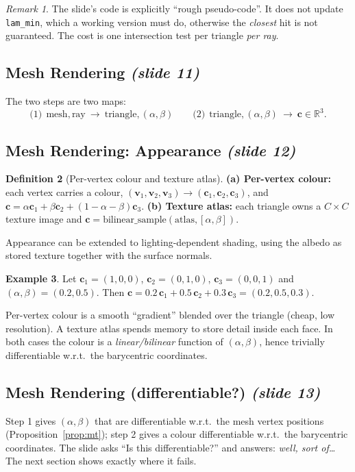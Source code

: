 \documentclass[11pt,a4paper]{article}
\newcommand{\sr}[1]{\texorpdfstring{\emph{(#1)}}{(#1)}}
\newcommand{\R}{\mathbb{R}}
\theoremstyle{definition}
\newtheorem{definition}{Definition}[section]
\newtheorem{example}[definition]{Example}
\theoremstyle{plain}
\theoremstyle{remark}
\newtheorem{remark}[definition]{Remark}
\begin{document}
\begin{remark}
The slide's code is explicitly ``rough pseudo-code''. It does not update \texttt{lam\_min}, which a working version must do, otherwise the \emph{closest} hit is not guaranteed. The cost is one intersection test per triangle \emph{per ray}.
\end{remark}

\subsection{Mesh Rendering \sr{slide 11}}
The two steps are two maps:
\[
\text{(1)}\ \ \text{mesh},\text{ray}\ \to\ \text{triangle},(\alpha,\beta)
\qquad
\text{(2)}\ \ \text{triangle},(\alpha,\beta)\ \to\ \bm c\in\R^3 .
\]

\subsection{Mesh Rendering: Appearance \sr{slide 12}}
\begin{definition}[Per-vertex colour and texture atlas]
\textbf{(a) Per-vertex colour:} each vertex carries a colour, $(\bm v_1,\bm v_2,\bm v_3)\to(\bm c_1,\bm c_2,\bm c_3)$, and
$\bm c=\alpha\bm c_1+\beta\bm c_2+(1-\alpha-\beta)\bm c_3$.
\textbf{(b) Texture atlas:} each triangle owns a $C\times C$ texture image and $\bm c=\text{bilinear\_sample}(\text{atlas},[\alpha,\beta])$.
\end{definition}
Appearance can be extended to lighting-dependent shading, using the albedo as stored texture together with the surface normals.

\begin{example}
Let $\bm c_1=(1,0,0)$, $\bm c_2=(0,1,0)$, $\bm c_3=(0,0,1)$ and $(\alpha,\beta)=(0.2,0.5)$. Then $\bm c=0.2\,\bm c_1+0.5\,\bm c_2+0.3\,\bm c_3=(0.2,0.5,0.3)$.
\end{example}

\begin{intuition}
Per-vertex colour is a smooth ``gradient'' blended over the triangle (cheap, low resolution). A texture atlas spends memory to store detail inside each face. In both cases the colour is a \emph{linear/bilinear} function of $(\alpha,\beta)$, hence trivially differentiable w.r.t.\ the barycentric coordinates.
\end{intuition}

\subsection{Mesh Rendering (differentiable?) \sr{slide 13}}
Step 1 gives $(\alpha,\beta)$ that are differentiable w.r.t.\ the mesh vertex positions (Proposition~\ref{prop:mt}); step 2 gives a colour differentiable w.r.t.\ the barycentric coordinates. The slide asks ``Is this differentiable?'' and answers: \emph{well, sort of\dots} The next section shows exactly where it fails.
\end{document}
